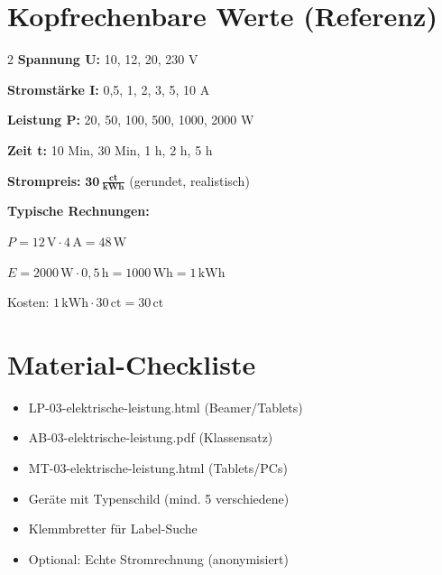 \documentclass[11pt, a4paper]{article}
\newcommand{\ein}[1]{\,\mathrm{#1}}
\begin{document}

\section*{Kopfrechenbare Werte (Referenz)}

\begin{multicols}{2}
\textbf{Spannung U:} 10, 12, 20, 230 V

\textbf{Stromstärke I:} 0,5, 1, 2, 3, 5, 10 A

\textbf{Leistung P:} 20, 50, 100, 500, 1000, 2000 W

\textbf{Zeit t:} 10 Min, 30 Min, 1 h, 2 h, 5 h

\textbf{Strompreis:} $\mathbf{30\,\frac{ct}{kWh}}$ (gerundet, realistisch)

\columnbreak

\textbf{Typische Rechnungen:}

$P = 12\ein{V} \cdot 4\ein{A} = 48\ein{W}$

$E = 2000\ein{W} \cdot 0,5\ein{h} = 1000\ein{Wh} = 1\ein{kWh}$

Kosten: $1\ein{kWh} \cdot 30\ein{ct} = 30\ein{ct}$
\end{multicols}


\section*{Material-Checkliste}

\begin{itemize}[leftmargin=1.5em, itemsep=3pt]
    \item[$\square$] LP-03-elektrische-leistung.html (Beamer/Tablets)
    \item[$\square$] AB-03-elektrische-leistung.pdf (Klassensatz)
    \item[$\square$] MT-03-elektrische-leistung.html (Tablets/PCs)
    \item[$\square$] Geräte mit Typenschild (mind. 5 verschiedene)
    \item[$\square$] Klemmbretter für Label-Suche
    \item[$\square$] Optional: Echte Stromrechnung (anonymisiert)
\end{itemize}
\end{document}

